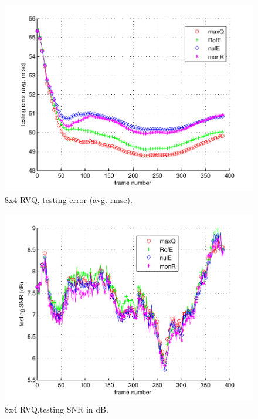 								\begin{figure}[h!]
								\centering
								\includegraphics[height=0.4\textheight]{thesis/7_car11_8_4_1000_tst_armse.pdf}
								\caption{8x4 RVQ, testing error (avg. rmse).}
								\label{fig:7_car11_8_4_1000_tst_armse}
								\end{figure}

								\begin{figure}[h!]
								\centering
								\includegraphics[height=0.4\textheight]{thesis/7_car11_8_4_1000_tst_SNRdB.pdf}
								\caption{8x4 RVQ,testing SNR in dB.}
								\label{fig:7_car11_8_4_1000_tst_SNRdB}
								\end{figure}
